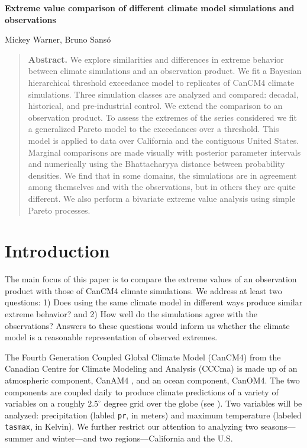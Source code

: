 \begin{Large}
\noindent \textbf{Extreme value comparison of different climate model simulations and observations}
\end{Large}
\bigskip

\noindent Mickey Warner, Bruno Sans{\'o}


\bigskip
\bigskip
\begin{quote}
\textbf{Abstract.} We explore similarities and differences in extreme behavior between climate simulations and an observation product. We fit a Bayesian hierarchical threshold exceedance model to replicates of CanCM4 climate simulations. Three simulation classes are analyzed and compared: decadal, historical, and pre-industrial control. We extend the comparison to an observation product. To assess the extremes of the series considered we fit a generalized Pareto model to the exceedances over a threshold. This model is applied to data over California and the contiguous United States. Marginal comparisons are made visually with posterior parameter intervals and numerically using the Bhattacharyya distance between probability densities. We find that in some domains, the simulations are in agreement among themselves and with the observations, but in others they are quite different. We also perform a bivariate extreme value analysis using simple Pareto processes.
\end{quote}

\section{Introduction}
\label{intro}

The main focus of this paper is to compare the extreme values of an observation product with those of CanCM4 climate simulations. We address at least two questions: 1) Does using the same climate model in different ways produce similar extreme behavior? and 2) How well do the simulations agree with the observations? Answers to these questions would inform us whether the climate model is a reasonable representation of observed extremes.

The Fourth Generation Coupled Global Climate Model (CanCM4) from the Canadian Centre for Climate Modeling and Analysis (CCCma) is made up of an atmospheric component, CanAM4 \citep{von2013canadian}, and an ocean component, CanOM4. The two components are coupled daily to produce climate predictions of a variety of variables on a roughly $2.5^\circ$ degree grid over the globe (see \cite{merryfield2013canadian}). Two variables will be analyzed: precipitation (labled \texttt{pr}, in meters) and maximum temperature (labeled \texttt{tasmax}, in Kelvin). We further restrict our attention to analyzing two seasons---summer and winter---and two regions---California and the U.S.

